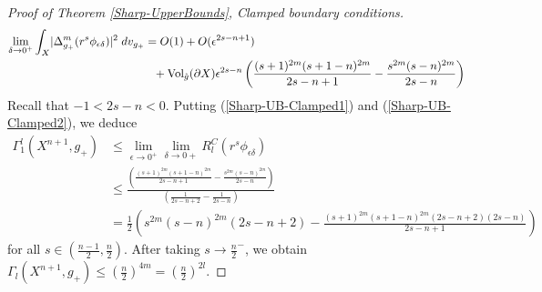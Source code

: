 \documentclass{amsart}
\newcommand{\Vol}{\text{Vol}}
\newcommand{\D}{\delta}
\newcommand{\E}{\epsilon}
\begin{document}
\begin{proof}[Proof of Theorem \ref{Sharp-UpperBounds}, Clamped boundary conditions]
\begin{equation}
    \begin{split}
    \lim_{\D\to0^+}\int_X&|\Delta^m_{g_+}(r^s\phi_{\E\D})|^2\;dv_{g_+} = O(1) + O(\E^{2s-n+1}) \\&\hspace{1.235in}+\Vol_{\hat g}(\partial X)\E^{2s-n}\left(\frac{(s+1)^{2m}(s+1-n)^{2m}}{2s-n+1} - \frac{s^{2m}(s-n)^{2m}}{2s-n}\right)
    \end{split}
    \end{equation}
    Recall that $-1<2s-n<0$. Putting (\ref{Sharp-UB-Clamped1}) and (\ref{Sharp-UB-Clamped2}), we deduce
    \[
    \begin{split}
    \Gamma^l_1(X^{n+1},g_+)&\le \lim_{\E\to0^+}\lim_{\D\to0+}R^C_l(r^s\phi_{\E\D}) \\&\le \frac{\displaystyle\left(\frac{(s+1)^{2m}(s+1-n)^{2m}}{2s-n+1} - \frac{s^{2m}(s-n)^{2m}}{2s-n}\right)}{\displaystyle\left(\frac{1}{2s -n + 2} - \frac{1}{2s-n}\right)}\\&= \frac{1}{2}\left(s^{2m}(s-n)^{2m}(2s-n+2) - \frac{(s+1)^{2m}(s+1-n)^{2m}(2s-n+2)(2s-n)}{2s-n+1}\right)
    \end{split}
    \]
    for all $s\in (\frac{n-1}{2},\frac{n}{2})$. After taking $s\to \frac{n}{2}^-$, we obtain $\Gamma_l(X^{n+1},g_+)\le \left(\frac{n}{2}\right)^{4m} = \left(\frac{n}{2}\right)^{2l}$.
    

\end{proof}
\end{document}
